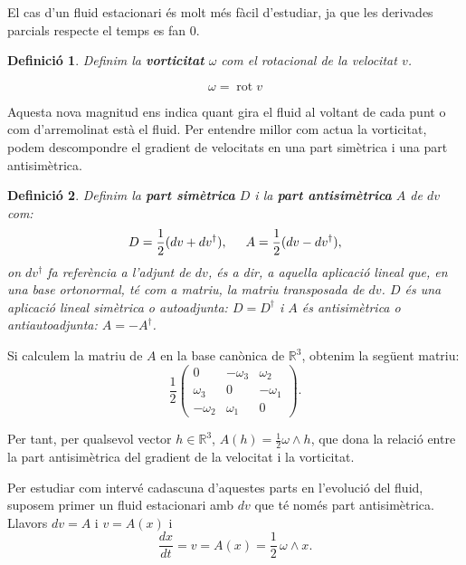 \documentclass{article}
\numberwithin{equation}{section}
\DeclareMathOperator{\rot}{rot}
\newtheorem{definicio}{Definici\'{o}}[section]
\begin{document}
El cas d'un fluid estacionari \'{e}s molt m\'{e}s f\`{a}cil d'estudiar, ja que les derivades parcials respecte el temps es fan 0.

\begin{definicio}
Definim la \textbf{vorticitat} $\omega$ com el rotacional de la velocitat $v$.

\begin{equation}
\omega=\rot v
\end{equation}
\end{definicio}

Aquesta nova magnitud ens indica quant gira el fluid al voltant de cada punt o com d'arremolinat est\`{a} el fluid. Per entendre millor com actua la vorticitat, podem descompondre el gradient de velocitats en una part sim\`{e}trica i una part antisim\`{e}trica.

\begin{definicio}
Definim la \textbf{part sim\`{e}trica} $D$ i la \textbf{part antisim\`{e}trica} $A$ de $dv$ com:
\begin{equation}
D=\frac{1}{2}(dv+dv^{\dagger}),\hspace{5mm}A=\frac{1}{2}(dv-dv^{\dagger}),
\end{equation}
on $dv^{\dagger}$ fa refer\`{e}ncia a l'adjunt de $dv$, \'{e}s a dir, a aquella aplicaci\'{o} lineal que, en una base ortonormal, t\'{e} com a matriu, la matriu transposada de $dv$. $D$ \'{e}s una aplicaci\'{o} lineal sim\`{e}trica o autoadjunta: $D=D^{\dagger}$ i $A$ \'{e}s antisim\`{e}trica o antiautoadjunta: $A=-A^{\dagger}$.
\end{definicio}

Si calculem la matriu de $A$ en la base can\`{o}nica de $\mathbb{R}^3$, obtenim la seg\"{u}ent matriu:
\begin{equation}
\frac{1}{2}\left(\begin{matrix}0&-\omega_3&\omega_2\\\omega_3&0&-\omega_1\\-\omega_2&\omega_1&0\end{matrix}\right).
\end{equation}

Per tant, per qualsevol vector $h\in\mathbb{R}^3$, $A(h)=\frac{1}{2}\omega\wedge h$, que dona la relaci\'{o} entre la part antisim\`{e}trica del gradient de la velocitat i la vorticitat.

Per estudiar com interv\'{e} cadascuna d'aquestes parts en l'evoluci\'{o} del fluid, suposem primer un fluid estacionari amb $dv$ que t\'{e} nom\'{e}s part antisim\`{e}trica. Llavors $dv=A$ i $v=A(x)$ i
\begin{equation}
\frac{dx}{dt}=v=A(x)=\frac{1}{2}\,\omega\wedge x.
\end{equation}
\end{document}
